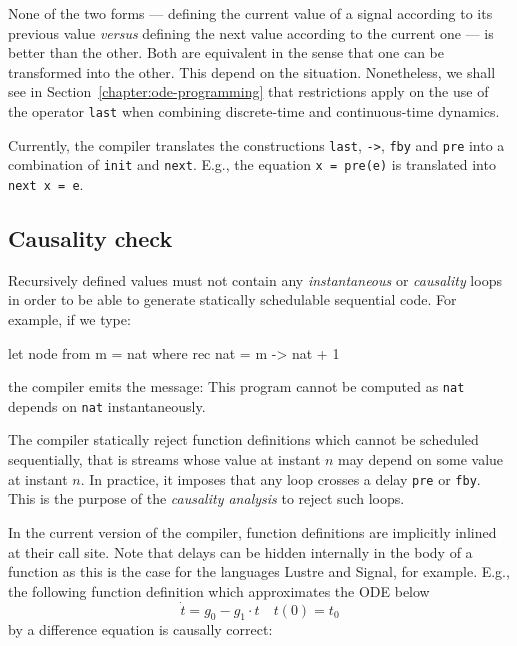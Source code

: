 \documentclass[11pt,titlepage,twoside]{report}
\newcommand{\lustre}{{\sf Lustre}}
\newcommand{\signal}{{\sf Signal}}
\begin{document}
None of the two forms --- defining the current value of a signal
according to its previous value \emph{versus} defining the next value
according to the current one --- is better than the other. Both are
equivalent in the sense that one can be transformed into the
other. This depend on the situation. Nonetheless, we shall see in
Section~\ref{chapter:ode-programming} that restrictions apply on the
use of the operator \texttt{last} when combining discrete-time and
continuous-time dynamics.

Currently, the compiler translates the
constructions \verb-last-, \verb+->+, \verb-fby- and \verb+pre+ into
a combination of \verb-init- and \verb-next-. E.g., the equation \texttt{x = pre(e)}
is translated into \texttt{next x = e}.

\subsection{Causality check}
\label{causality-check}
Recursively defined values must not contain any {\em instantaneous} or
{\em causality} loops in order to be able to generate statically schedulable
sequential code. For example, if we type:
\begin{runverbatim}[fail]
let node from m = nat where
  rec nat = m -> nat + 1
\end{runverbatim}
the compiler emits the message:
\runverbatimerr{}
This program cannot be computed as {\tt nat} depends on {\tt nat}
instantaneously.

The compiler statically reject function definitions which cannot be scheduled
sequentially, that is streams whose value at instant $n$ may depend on
some value at instant $n$. In practice, it imposes that any loop
crosses a delay \verb-pre- or \verb-fby-. This is the purpose of
the \emph{causality analysis} to reject such loops.

In the current version of the compiler, function definitions are
implicitly inlined at their call site. Note that delays can be hidden
internally in the body of a function as this is the case for the languages \lustre{}
and \signal, for example. E.g., the following function definition
which approximates the \ac{ODE} below
\[
\dot{t} = g_0 - g_1 \cdot t \quad t(0) = t_0
\]
by a difference equation is causally correct:
\end{document}
